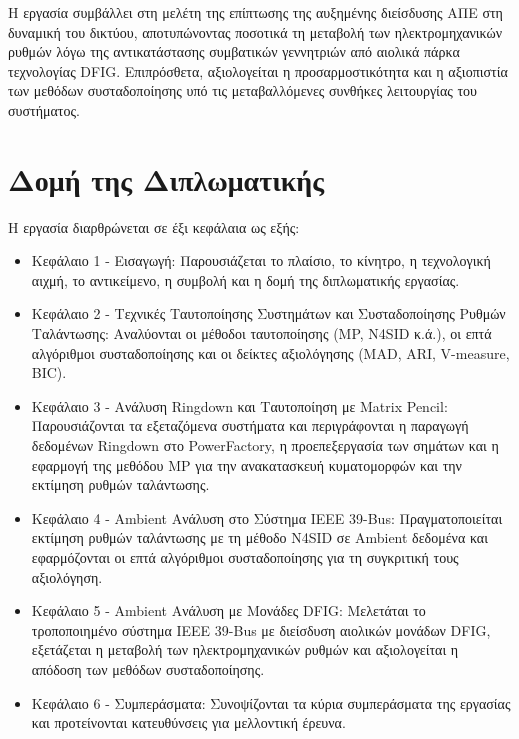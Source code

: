 Η εργασία συμβάλλει στη μελέτη της επίπτωσης της αυξημένης διείσδυσης ΑΠΕ στη δυναμική του δικτύου, αποτυπώνοντας ποσοτικά τη μεταβολή των ηλεκτρομηχανικών ρυθμών λόγω της αντικατάστασης συμβατικών γεννητριών από αιολικά πάρκα τεχνολογίας DFIG. Επιπρόσθετα, αξιολογείται η προσαρμοστικότητα και η αξιοπιστία των μεθόδων συσταδοποίησης υπό τις μεταβαλλόμενες συνθήκες λειτουργίας του συστήματος.

\section{Δομή της Διπλωματικής}

Η εργασία διαρθρώνεται σε έξι κεφάλαια ως εξής:

\begin{itemize}
    \item Κεφάλαιο 1 - Εισαγωγή: Παρουσιάζεται το πλαίσιο, το κίνητρο, η τεχνολογική αιχμή, το αντικείμενο, η συμβολή και η δομή της διπλωματικής εργασίας.

    \item Κεφάλαιο 2 - Τεχνικές Ταυτοποίησης Συστημάτων και Συσταδοποίησης Ρυθμών Ταλάντωσης: Αναλύονται οι μέθοδοι ταυτοποίησης (MP, N4SID κ.ά.), οι επτά αλγόριθμοι συσταδοποίησης και οι δείκτες αξιολόγησης (MAD, ARI, V-measure, BIC).

    \item Κεφάλαιο 3 - Ανάλυση Ringdown και Ταυτοποίηση με Matrix Pencil: Παρουσιάζονται τα εξεταζόμενα συστήματα και περιγράφονται η παραγωγή δεδομένων Ringdown στο PowerFactory, η προεπεξεργασία των σημάτων και η εφαρμογή της μεθόδου MP για την ανακατασκευή κυματομορφών και την εκτίμηση ρυθμών ταλάντωσης.

    \item Κεφάλαιο 4 - Ambient Ανάλυση στο Σύστημα IEEE 39-Bus: Πραγματοποιείται εκτίμηση ρυθμών ταλάντωσης με τη μέθοδο N4SID σε Ambient δεδομένα και εφαρμόζονται οι επτά αλγόριθμοι συσταδοποίησης για τη συγκριτική τους αξιολόγηση.

    \item Κεφάλαιο 5 - Ambient Ανάλυση με Μονάδες DFIG: Μελετάται το τροποποιημένο σύστημα IEEE 39-Bus με διείσδυση αιολικών μονάδων DFIG, εξετάζεται η μεταβολή των ηλεκτρομηχανικών ρυθμών και αξιολογείται η απόδοση των μεθόδων συσταδοποίησης.

    \item Κεφάλαιο 6 - Συμπεράσματα: Συνοψίζονται τα κύρια συμπεράσματα της εργασίας και προτείνονται κατευθύνσεις για μελλοντική έρευνα.
\end{itemize}
